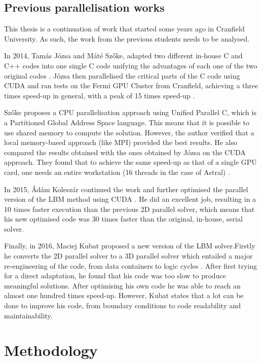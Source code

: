 \documentclass[12pt, openany]{book}
\begin{document}
\section{Previous parallelisation works}
This thesis is a continuation of work that started some years ago in Cranfield University. As such, the work from the previous students needs to be analysed. \par
In 2014, Tamás Józsa and Máté Szőke, adapted two different in-house C and C++ codes into one single C code unifying the advantages of each one of the two original codes \cite{jozsa_thesis,szoke_thesis}. Józsa then parallelised the critical parts of the C code using CUDA and ran tests on the Fermi GPU Cluster from Cranfield, achieving a three times speed-up in general, with a peak of 15 times speed-up \cite{jozsa_thesis}. \par
Szőke proposes a CPU parallelisation approach using Unified Parallel C, which is a Partitioned Global Address Space language\cite{szoke_thesis}. This means that it is possible to use shared memory to compute the solution. However, the author verified that a local memory-based approach (like MPI) provided the best results. He also compared the results obtained with the ones obtained by Józsa on the CUDA approach. They found that to achieve the same speed-up as that of a single GPU card, one needs an entire workstation (16 threads in the case of Astral) \cite{szoke_thesis}.\par
In 2015, Ádám Koleszár continued the work and further optimised the parallel version of the LBM method using CUDA \cite{koleszar_thesis}. He did an excellent job, resulting in a 10 times faster execution than the previous 2D parallel solver, which means that his new optimised code was 30 times faster than the original, in-house, serial solver.\par
Finally, in 2016, Maciej Kubat proposed a new version of the LBM solver.Firstly he converts the 2D parallel solver to a 3D parallel solver which entailed a major re-engineering of the code, from data containers to logic cycles \cite{maciej_thesis}. After first trying for a direct adaptation, he found that his code was too slow to produce meaningful solutions. After optimising his own code he was able to reach an almost one hundred times speed-up.
However, Kubat states that a lot can be done to improve his code, from boundary conditions to code readability and maintainability. 
\chapter{Methodology}
\end{document}
